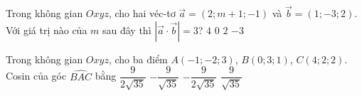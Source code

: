 \begin{ex}%
	Trong không gian $Oxyz$, cho hai véc-tơ $\overrightarrow{a}=\left( 2;m+1;-1 \right)$ và $\overrightarrow{b}=\left( 1;-3;2 \right)$. Với giá trị nào của $ m$ sau đây thì $\left| \overrightarrow{a}\cdot \overrightarrow{b} \right|=3$?
	\choice
	{$4$}
	{\True $0$}
	{$2$}
	{$-3$}
	\loigiai{
		Ta có 
			\allowdisplaybreaks			
			\begin{eqnarray*}
				\left| \overrightarrow{a}\cdot \overrightarrow{b} \right|=3
				&\Leftrightarrow& \left| 2\cdot 1-3\cdot \left( m+1 \right)+2\cdot (-1) \right|=3\Leftrightarrow \left| -3m-3 \right|=3\\
				&\Leftrightarrow& \left[ \begin{aligned}
					& m+1=1 \\
					& m+1=-1 \\
				\end{aligned} \right.\Leftrightarrow \left[ \begin{aligned}
					& m=0 \\
					& m=-2. \\
				\end{aligned} \right.
			\end{eqnarray*}
		}
\end{ex}

\begin{ex}%
	Trong không gian $Oxyz$, cho ba điểm $A(-1;-2;3)$, $B(0;3;1)$, $C(4;2;2)$. Cosin của góc $\widehat{BAC}$ bằng
	\choice
	{\True $\dfrac{9}{2\sqrt{35}}$}
	{$-\dfrac{9}{\sqrt{35}}$}
	{$-\dfrac{9}{2\sqrt{35}}$}
	{$\dfrac{9}{\sqrt{35}}$}
\end{ex}



